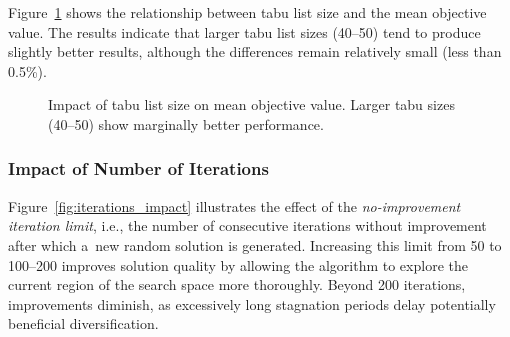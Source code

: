 Figure~\ref{fig:tabu_size_impact} shows the relationship between tabu list size and the mean objective value. The results indicate that larger tabu list sizes (40--50) tend to produce slightly better results, although the differences remain relatively small (less than 0.5\%).

\begin{figure}[ht]
    \centering
    \caption{Impact of tabu list size on mean objective value. Larger tabu sizes (40--50) show marginally better performance.}
    \label{fig:tabu_size_impact}
\end{figure}

\subsubsection{Impact of Number of Iterations}

Figure~\ref{fig:iterations_impact} illustrates the effect of the \textit{no-improvement iteration limit}, i.e., the number of consecutive iterations without improvement after which a~new random solution is generated. Increasing this limit from 50 to 100--200 improves solution quality by allowing the algorithm to explore the current region of the search space more thoroughly. Beyond 200 iterations, improvements diminish, as excessively long stagnation periods delay potentially beneficial diversification.

